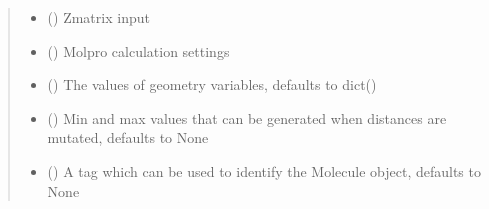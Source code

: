 \documentclass[letterpaper,10pt,english]{sphinxmanual}
\begin{document}
\begin{fulllineitems}
\begin{quote}
\begin{description}
\begin{itemize}
\item {} 
\sphinxAtStartPar
{} (\sphinxstyleliteralemphasis{\sphinxupquote{{[}}}\sphinxstyleliteralemphasis{\sphinxupquote{{[}}}\sphinxstyleliteralemphasis{\sphinxupquote{{]}}}\sphinxstyleliteralemphasis{\sphinxupquote{{]}}}) \textendash{} Z\sphinxhyphen{}matrix input

\item {} 
\sphinxAtStartPar
{} (\sphinxstyleliteralemphasis{\sphinxupquote{{[}}}\sphinxstyleliteralemphasis{\sphinxupquote{{]}}}) \textendash{} Molpro calculation settings

\item {} 
\sphinxAtStartPar
{} (\sphinxstyleliteralemphasis{\sphinxupquote{{[}}}\sphinxstyleliteralemphasis{\sphinxupquote{, }}\sphinxstyleliteralemphasis{\sphinxupquote{{]}}}\sphinxstyleliteralemphasis{\sphinxupquote{, }}) \textendash{} The values of geometry variables, defaults to dict()

\item {} 
\sphinxAtStartPar
{} (\sphinxstyleliteralemphasis{\sphinxupquote{{[}}}\sphinxstyleliteralemphasis{\sphinxupquote{, }}\sphinxstyleliteralemphasis{\sphinxupquote{{]}}}\sphinxstyleliteralemphasis{\sphinxupquote{, }}) \textendash{} Min and max values that can be generated when distances are mutated, defaults to None

\item {} 
\sphinxAtStartPar
{} (\sphinxstyleliteralemphasis{\sphinxupquote{, }}) \textendash{} A tag which can be used to identify the Molecule object, defaults to None


\end{itemize}
\end{description}
\end{quote}
\end{fulllineitems}
\end{document}
